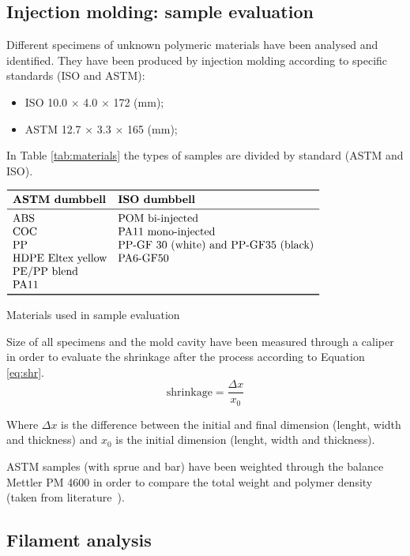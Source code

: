 \documentclass[a4paper, 11pt]{article}
\begin{document}
\subsection{Injection molding: sample evaluation}
Different specimens of unknown polymeric materials have been analysed and identified. They have been produced by injection molding according to specific standards (ISO and ASTM):
\begin{itemize}
\item ISO 10.0 $\times$ 4.0 $\times$ 172 (mm);
\item ASTM 12.7 $\times$ 3.3 $\times$ 165 (mm);
\end{itemize}

In Table \ref{tab:materials} the types of samples are divided by standard (ASTM and ISO). 
\begin{table}[htp]
	\centering
	$
	\begin{array}{ll}
	\toprule
	\textbf{ASTM dumbbell} & \textbf{ISO dumbbell}  \\
	\midrule
	\text{ABS} & \text{POM bi-injected}\\
        \text{COC} & \text{PA11 mono-injected}\\
	\text{PP} & \text{PP-GF 30 (white) and PP-GF35 (black)}\\
	\text{HDPE Eltex yellow} & \text{PA6-GF50}\\
	\text{PE/PP blend} & \text{}\\
	\text{PA11} & \text{}\\
	\bottomrule
	\end{array}
	$
	\caption{Materials used in sample evaluation}
	\label{tab:materials}
\end{table}

Size of all specimens and the mold cavity have been measured through a caliper in order to evaluate the shrinkage after the process according to Equation \ref{eq:shr}.
\begin{equation}
\text{shrinkage} = \frac{\Delta x}{x_0}
\label{eq:shr}
\end{equation}

Where $\Delta x$ is the difference between the initial and final dimension (lenght, width and thickness) and $x_0$ is the initial dimension (lenght, width and thickness). 

ASTM samples (with sprue and bar) have been weighted through the balance Mettler PM 4600 in order to compare the total weight and polymer density (taken from literature~\cite{handbook}).

\subsection{Filament analysis}
\end{document}
